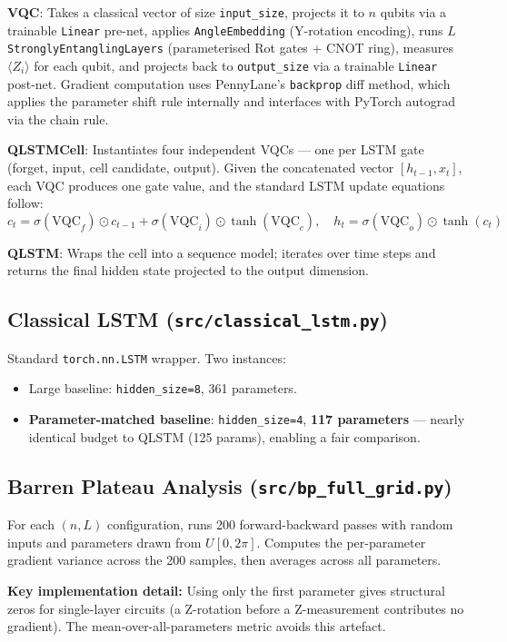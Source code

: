 \documentclass[11pt,a4paper]{article}
\begin{document}
\textbf{VQC}: Takes a classical vector of size \texttt{input\_size}, projects it to $n$ qubits via a trainable \texttt{Linear} pre-net, applies \texttt{AngleEmbedding} (Y-rotation encoding), runs $L$ \texttt{StronglyEntanglingLayers} (parameterised Rot gates + CNOT ring), measures $\langle Z_i\rangle$ for each qubit, and projects back to \texttt{output\_size} via a trainable \texttt{Linear} post-net. Gradient computation uses PennyLane's \texttt{backprop} diff method, which applies the parameter shift rule internally and interfaces with PyTorch autograd via the chain rule.

\textbf{QLSTMCell}: Instantiates four independent VQCs — one per LSTM gate (forget, input, cell candidate, output). Given the concatenated vector $[h_{t-1}, x_t]$, each VQC produces one gate value, and the standard LSTM update equations follow:
\[
  c_t = \sigma(\text{VQC}_f) \odot c_{t-1} + \sigma(\text{VQC}_i) \odot \tanh(\text{VQC}_c), \quad
  h_t = \sigma(\text{VQC}_o) \odot \tanh(c_t)
\]

\textbf{QLSTM}: Wraps the cell into a sequence model; iterates over time steps and returns the final hidden state projected to the output dimension.

\subsection{Classical LSTM (\texttt{src/classical\_lstm.py})}

Standard \texttt{torch.nn.LSTM} wrapper. Two instances:
\begin{itemize}
  \item Large baseline: \texttt{hidden\_size=8}, 361 parameters.
  \item \textbf{Parameter-matched baseline}: \texttt{hidden\_size=4}, \textbf{117 parameters} — nearly identical budget to QLSTM (125 params), enabling a fair comparison.
\end{itemize}

\subsection{Barren Plateau Analysis (\texttt{src/bp\_full\_grid.py})}

For each $(n,L)$ configuration, runs 200 forward-backward passes with random inputs and parameters drawn from $U[0, 2\pi]$. Computes the per-parameter gradient variance across the 200 samples, then averages across all parameters.

\textbf{Key implementation detail:} Using only the first parameter gives structural zeros for single-layer circuits (a Z-rotation before a Z-measurement contributes no gradient). The mean-over-all-parameters metric avoids this artefact.
\end{document}
